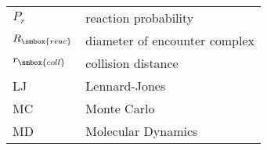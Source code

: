 \begin{center}
\begin{longtable}{|l|l|}
$P_r$            & reaction probability           \\
$R_{\smbox{reac}}$& diameter of encounter complex \\
$r_{\smbox{coll}}$& collision distance            \\
\hline

LJ               & Lennard-Jones                  \\
MC               & Monte Carlo                    \\
MD               & Molecular Dynamics             \\

\hline
\end{longtable}
\end{center}

\hfill
